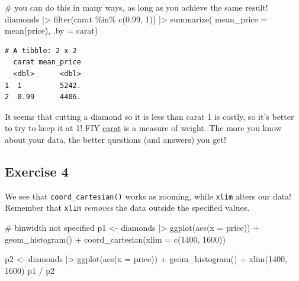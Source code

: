 \documentclass[
  letterpaper,
  DIV=11,
  numbers=noendperiod]{scrreprt}
\newenvironment{Shaded}{\begin{snugshade}}{\end{snugshade}}
\newcommand{\AttributeTok}[1]{\textcolor[rgb]{0.40,0.45,0.13}{#1}}
\newcommand{\CommentTok}[1]{\textcolor[rgb]{0.37,0.37,0.37}{#1}}
\newcommand{\DecValTok}[1]{\textcolor[rgb]{0.68,0.00,0.00}{#1}}
\newcommand{\FloatTok}[1]{\textcolor[rgb]{0.68,0.00,0.00}{#1}}
\newcommand{\FunctionTok}[1]{\textcolor[rgb]{0.28,0.35,0.67}{#1}}
\newcommand{\NormalTok}[1]{\textcolor[rgb]{0.00,0.23,0.31}{#1}}
\newcommand{\OtherTok}[1]{\textcolor[rgb]{0.00,0.23,0.31}{#1}}
\newcommand{\SpecialCharTok}[1]{\textcolor[rgb]{0.37,0.37,0.37}{#1}}
\begin{document}
\begin{Shaded}
\begin{Highlighting}[]
\CommentTok{\# you can do this in many ways, as long as you achieve the same result!}
\NormalTok{diamonds }\SpecialCharTok{|\textgreater{}}
  \FunctionTok{filter}\NormalTok{(carat }\SpecialCharTok{\%in\%} \FunctionTok{c}\NormalTok{(}\FloatTok{0.99}\NormalTok{, }\DecValTok{1}\NormalTok{)) }\SpecialCharTok{|\textgreater{}}
  \FunctionTok{summarize}\NormalTok{(}
    \AttributeTok{mean\_price =} \FunctionTok{mean}\NormalTok{(price),}
    \AttributeTok{.by =}\NormalTok{ carat)}
\end{Highlighting}
\end{Shaded}

\begin{verbatim}
# A tibble: 2 x 2
  carat mean_price
  <dbl>      <dbl>
1  1         5242.
2  0.99      4406.
\end{verbatim}

It seems that cutting a diamond so it is less than carat 1 is costly, so
it's better to try to keep it at 1! FIY
\href{https://en.wikipedia.org/wiki/Carat_(mass)}{carat} is a measure of
weight. The more you know about your data, the better questions (and
answers) you get!

\subsection{Exercise 4}\label{exercise-4-9}

We see that \texttt{coord\_cartesian()} works as zooming, while
\texttt{xlim} alters our data! Remember that \texttt{xlim}
\emph{removes} the data outside the specified values.

\begin{Shaded}
\begin{Highlighting}[]
\CommentTok{\# binwidth not specified}
\NormalTok{p1 }\OtherTok{\textless{}{-}}\NormalTok{ diamonds }\SpecialCharTok{|\textgreater{}}
  \FunctionTok{ggplot}\NormalTok{(}\FunctionTok{aes}\NormalTok{(}\AttributeTok{x =}\NormalTok{ price)) }\SpecialCharTok{+} 
  \FunctionTok{geom\_histogram}\NormalTok{() }\SpecialCharTok{+} 
  \FunctionTok{coord\_cartesian}\NormalTok{(}\AttributeTok{xlim =} \FunctionTok{c}\NormalTok{(}\DecValTok{1400}\NormalTok{, }\DecValTok{1600}\NormalTok{))}

\NormalTok{p2 }\OtherTok{\textless{}{-}}\NormalTok{ diamonds }\SpecialCharTok{|\textgreater{}}
  \FunctionTok{ggplot}\NormalTok{(}\FunctionTok{aes}\NormalTok{(}\AttributeTok{x =}\NormalTok{ price)) }\SpecialCharTok{+} 
  \FunctionTok{geom\_histogram}\NormalTok{() }\SpecialCharTok{+} 
  \FunctionTok{xlim}\NormalTok{(}\DecValTok{1400}\NormalTok{, }\DecValTok{1600}\NormalTok{)}
\NormalTok{p1 }\SpecialCharTok{/}\NormalTok{ p2}
\end{Highlighting}
\end{Shaded}
\end{document}
